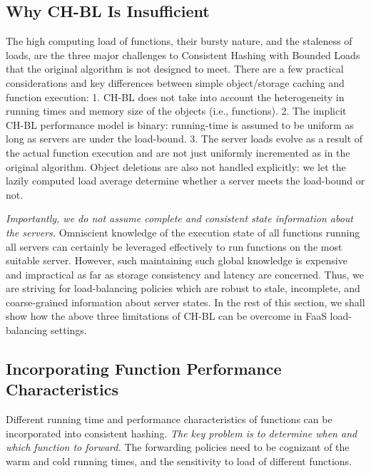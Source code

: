 
\subsection{Why CH-BL Is Insufficient}

The high computing load of functions, their bursty nature, and the staleness of loads, are the three major challenges to Consistent Hashing with Bounded Loads~\cite{mirrokni2018consistent} that the original algorithm is not designed to meet. 
There are a few practical considerations and key differences between simple object/storage caching and function execution:
1. CH-BL does not take into account the heterogeneity in running times and memory size of the objects (i.e., functions).
2. The implicit CH-BL performance model is binary: running-time is assumed to be uniform as long as servers are under the load-bound. 
3. The server loads evolve as a result of the actual function execution and are not just uniformly incremented as in the original algorithm. Object deletions are also not handled explicitly: we let the lazily computed load average determine whether a server meets the load-bound or not. 

\emph{Importantly, we do not assume complete and consistent state information about the servers.}
Omniscient knowledge of the execution state of all functions running all servers can certainly be leveraged effectively to run functions on the most suitable server.
However, such maintaining such global knowledge is expensive and impractical as far as storage consistency and latency are concerned.
Thus, we are striving for load-balancing policies which are robust to stale, incomplete, and coarse-grained information about server states. 
In the rest of this section, we shall show how the above three limitations of CH-BL can be overcome in FaaS load-balancing settings. 

\subsection{Incorporating Function Performance Characteristics}
\label{subsec:chch}


Different running time and performance characteristics of functions can be incorporated into consistent hashing.
\emph{The key problem is to determine when and which function to forward.}
The forwarding policies need to be cognizant of the warm and cold running times, and the sensitivity to load of different functions. 

